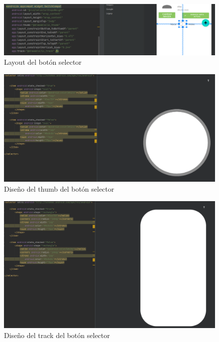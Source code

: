 \begin{figure}[H]
    \centering
    \includegraphics[width=\textwidth]{Images/Capitulo7/layoutselector.png}
    \caption{Layout del botón selector}
    \label{fig:layoutselector}
\end{figure}
\begin{figure}[H]
    \centering
    \includegraphics[width=\textwidth]{Images/Capitulo7/circulo.png}
    \caption{Diseño del thumb del botón selector}
    \label{fig:circulo}
\end{figure}
\begin{figure}[H]
    \centering
    \includegraphics[width=\textwidth]{Images/Capitulo7/rectangulo.png}
    \caption{Diseño del track del botón selector}
    \label{fig:rectangulo}
\end{figure}

